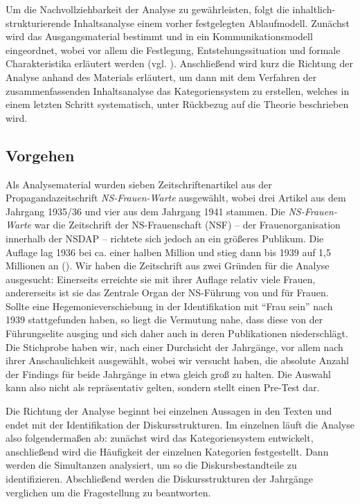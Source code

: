 \documentclass[12pt, titlepage=true, toc=bib]{scrartcl}
\begin{document}
{Um die Nachvollziehbarkeit der Analyse zu gewährleisten, folgt die inhaltlich-strukturierende Inhaltsanalyse einem vorher festgelegten Ablaufmodell. Zunächst wird das Ausgangsmaterial bestimmt und in ein Kommunikationsmodell eingeordnet, wobei vor allem die Festlegung, Entstehungssituation und formale Charakteristika erläutert werden (vgl. \cite[52-53]{mayring_qualitative_2010}). Anschließend wird kurz die Richtung der Analyse anhand des Materials erläutert, um dann mit dem Verfahren der zusammenfassenden Inhaltsanalyse das Kategoriensystem zu erstellen, welches in einem letzten Schritt systematisch, unter Rückbezug auf die Theorie beschrieben wird.

\subsection{Vorgehen}

Als Analysematerial wurden sieben Zeitschriftenartikel aus der Propagandazeitschrift \textit{NS-Frauen-Warte} ausgewählt, wobei drei Artikel aus dem Jahrgang 1935/36 und vier aus dem Jahrgang 1941 stammen. Die \textit{NS-Frauen-Warte} war die Zeitschrift der NS-Frauenschaft (NSF) -- der Frauenorganisation innerhalb der NSDAP -- richtete sich jedoch an ein größeres Publikum. Die Auflage lag 1936 bei ca. einer halben Million und stieg dann bis 1939 auf 1,5 Millionen an (\cite[vgl.][89-90]{dohring_von_2004}). Wir haben die Zeitschrift aus zwei Gründen für die Analyse ausgesucht: Einerseits erreichte sie mit ihrer Auflage relativ viele Frauen, andererseits ist sie das Zentrale Organ der NS-Führung von und für Frauen. Sollte eine Hegemonieverschiebung in der Identifikation mit "`Frau sein"' nach 1939 stattgefunden haben, so liegt die Vermutung nahe, dass diese von der Führungselite ausging und sich daher auch in deren Publikationen niederschlägt. Die Stichprobe haben wir, nach einer Durchsicht der Jahrgänge, vor allem nach ihrer Anschaulichkeit ausgewählt, wobei wir versucht haben, die absolute Anzahl der Findings für beide Jahrgänge in etwa gleich groß zu halten. Die Auswahl kann also nicht als repräsentativ gelten, sondern stellt einen Pre-Test dar.

Die Richtung der Analyse beginnt bei einzelnen Aussagen in den Texten und endet mit der Identifikation der Diskursstrukturen. Im einzelnen läuft die Analyse also folgendermaßen ab: zunächst wird das Kategoriensystem entwickelt, anschließend wird die Häufigkeit der einzelnen Kategorien festgestellt. Dann werden die Simultanzen analysiert, um so die Diskursbestandteile zu identifizieren. Abschließend werden die Diskursstrukturen der Jahrgänge verglichen um die Fragestellung zu beantworten.

}
\end{document}

